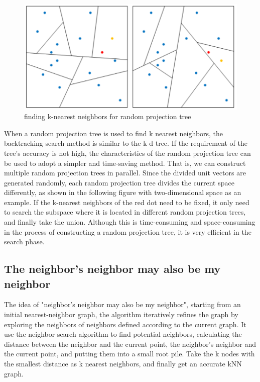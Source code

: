 \begin{figure}[ht]

\centering
\includegraphics[scale=0.85]{images/image_largevis_random_projection_tree_2.PNG}
\caption{finding k-nearest neighbors for random projection tree}
\label{fig:label}
\end{figure}

\noindent When a random projection tree is used to find k nearest neighbors, the backtracking search method is similar to the k-d tree. If the requirement of the tree's accuracy is not high, the characteristics of the random projection tree can be used to adopt a simpler and time-saving method. That is, we can construct multiple random projection trees in parallel. Since the divided unit vectors are generated randomly, each random projection tree divides the current space differently, as shown in the following figure with two-dimensional space as an example. If the k-nearest neighbors of the red dot need to be fixed, it only need to search the subspace where it is located in different random projection trees, and finally take the union. Although this is time-consuming and space-consuming in the process of constructing a random projection tree, it is very efficient in the search phase.

\subsection{The neighbor’s neighbor may also be my neighbor}

The idea of "neighbor's neighbor may also be my neighbor", starting from an initial nearest-neighbor graph, the algorithm iteratively refines the graph by exploring the neighbors of neighbors defined according to the current graph\cite{ref5}. It use the neighbor search algorithm to find potential neighbors, calculating the distance between the neighbor and the current point, the neighbor's neighbor and the current point, and putting them into a small root pile. Take the k nodes with the smallest distance as k nearest neighbors, and finally get an accurate kNN graph.\\

